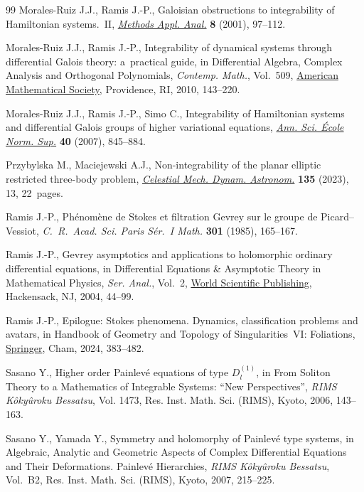 \begin{thebibliography}{99}
Morales-Ruiz J.J., Ramis J.-P., Galoisian obstructions to integrability of
 {H}amiltonian systems.~{II}, \href{https://doi.org/10.4310/MAA.2001.v8.n1.a4}{\textit{Methods Appl. Anal.}} \textbf{8} (2001),
 97--112.

Morales-Ruiz J.J., Ramis J.-P., Integrability of dynamical systems through
 differential {G}alois theory: a~practical guide, in Differential Algebra,
 Complex Analysis and Orthogonal Polynomials, \textit{Contemp. Math.}, Vol.~509, \href{https://doi.org/10.1090/conm/509/09980}{American Mathematical Society}, Providence, RI, 2010, 143--220.

Morales-Ruiz J.J., Ramis J.-P., Simo C., Integrability of {H}amiltonian systems
 and differential {G}alois groups of higher variational equations,
 \href{https://doi.org/10.1016/j.ansens.2007.09.002}{\textit{Ann. Sci. \'{E}cole Norm. Sup.}} \textbf{40} (2007), 845--884.

Przybylska M., Maciejewski A.J., Non-integrability of the planar elliptic
 restricted three-body problem, \href{https://doi.org/10.1007/s10569-022-10120-5}{\textit{Celestial Mech. Dynam. Astronom.}}
 \textbf{135} (2023), 13, 22~pages.

Ramis J.-P., Ph\'enom\`ene de {S}tokes et filtration {G}evrey sur le groupe de
 {P}icard--{V}essiot, \textit{C.~R.~Acad. Sci. Paris S\'er.~{I} Math.}
 \textbf{301} (1985), 165--167.

Ramis J.-P., Gevrey asymptotics and applications to holomorphic ordinary
 differential equations, in Differential Equations \& Asymptotic Theory in
 Mathematical Physics, \textit{Ser. Anal.}, Vol.~2, \href{https://doi.org/10.1142/9789812702395_0002}{World Scientific
 Publishing}, Hackensack, NJ, 2004, 44--99.

Ramis J.-P., Epilogue: Stokes phenomena. Dynamics, classification problems and
 avatars, in Handbook of Geometry and Topology of Singularities~{VI}:
 Foliations, \href{https://doi.org/10.1007/978-3-031-54172-8_10}{Springer}, Cham, 2024, 383--482.

Sasano Y., Higher order {P}ainlev\'e equations of type {$D^{(1)}_l$}, in From
 Soliton Theory to a Mathematics of Integrable Systems: ``New Perspectives'',
 \textit{RIMS K\^oky\^uroku Bessatsu}, Vol. 1473, Res. Inst. Math. Sci.
 (RIMS), Kyoto, 2006, 143--163.

Sasano Y., Yamada Y., Symmetry and holomorphy of {P}ainlev\'e type systems, in
 Algebraic, Analytic and Geometric Aspects of Complex Differential Equations
 and Their Deformations. {P}ainlev\'e Hierarchies, \textit{RIMS K\^oky\^uroku
 Bessatsu}, Vol.~B2, Res. Inst. Math. Sci. (RIMS), Kyoto, 2007, 215--225.


\end{thebibliography}

